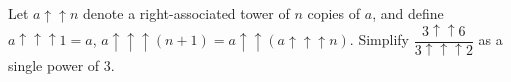 Let $a\uparrow\uparrow n$ denote a right-associated tower of $n$ copies of $a$, and define $a\uparrow\uparrow\uparrow1=a$, $a\uparrow\uparrow\uparrow(n+1)=a\uparrow\uparrow(a\uparrow\uparrow\uparrow n)$. Simplify $\dfrac{3\uparrow\uparrow6}{3\uparrow\uparrow\uparrow2}$ as a single power of $3$.
